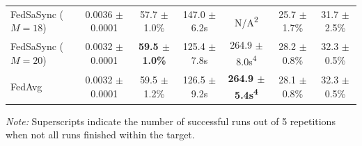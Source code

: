 \begin{table}[t]
{\begin{tabular}{lcccccc}
FedSaSync ($M = 18$) & 0.0036 $\pm$ 0.0001 & 57.7 $\pm$ 1.0\% & 147.0 $\pm$ 6.2s & N/A\textsuperscript{2} & 25.7 $\pm$ 1.7\% & 31.7 $\pm$ 2.5\% \\
FedSaSync ($M = 20$) & 0.0032 $\pm$ 0.0001 & \textbf{59.5 $\pm$ 1.0\%} & 125.4 $\pm$ 7.8s & 264.9 $\pm$ 8.0s\textsuperscript{4} & 28.2 $\pm$ 0.8\% & 32.3 $\pm$ 0.5\% \\
FedAvg & 0.0032 $\pm$ 0.0001 & 59.5 $\pm$ 1.2\% & 126.5 $\pm$ 9.2s & \textbf{264.9 $\pm$ 5.4s\textsuperscript{4}} & 28.1 $\pm$ 0.8\% & 32.3 $\pm$ 0.5\% \\
\hline
\end{tabular}%
}
\par\vspace{0.8em}
\raggedright \footnotesize \textit{Note:} Superscripts indicate the number of successful runs out of 5 repetitions when not all runs finished within the target.
\end{table}